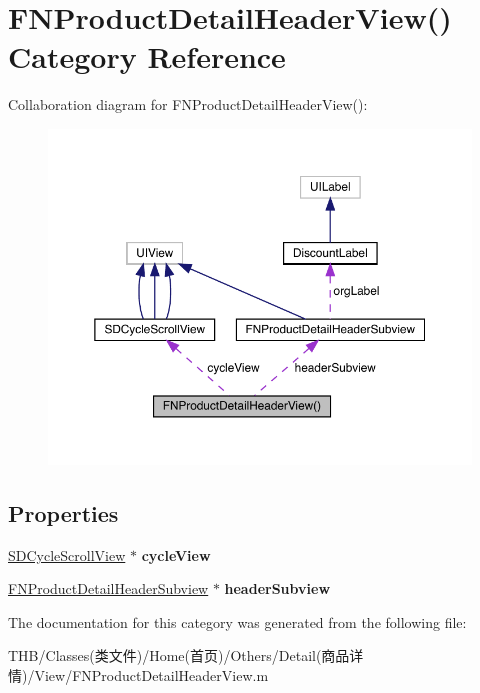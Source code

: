 \hypertarget{category_f_n_product_detail_header_view_07_08}{}\section{F\+N\+Product\+Detail\+Header\+View() Category Reference}
\label{category_f_n_product_detail_header_view_07_08}


Collaboration diagram for F\+N\+Product\+Detail\+Header\+View()\+:\nopagebreak
\begin{figure}[H]
\begin{center}
\leavevmode
\includegraphics[width=350pt]{category_f_n_product_detail_header_view_07_08__coll__graph}
\end{center}
\end{figure}
\subsection*{Properties}
\begin{DoxyCompactItemize}
\item 
\mbox{\label{category_f_n_product_detail_header_view_07_08_af9acf58ec001fc4c23055c7f7409a42b}} 
\mbox{\hyperlink{interface_s_d_cycle_scroll_view}{S\+D\+Cycle\+Scroll\+View}} $\ast$ {\bfseries cycle\+View}
\item 
\mbox{\label{category_f_n_product_detail_header_view_07_08_a4c4580d12e83282c0911dee4b14a4735}} 
\mbox{\hyperlink{interface_f_n_product_detail_header_subview}{F\+N\+Product\+Detail\+Header\+Subview}} $\ast$ {\bfseries header\+Subview}
\end{DoxyCompactItemize}


The documentation for this category was generated from the following file\+:\begin{DoxyCompactItemize}
\item 
T\+H\+B/\+Classes(类文件)/\+Home(首页)/\+Others/\+Detail(商品详情)/\+View/F\+N\+Product\+Detail\+Header\+View.\+m\end{DoxyCompactItemize}
